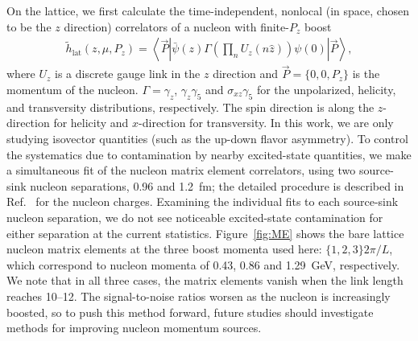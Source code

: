 On the lattice, we first calculate the time-independent, nonlocal (in space, chosen to be the $z$ direction) correlators of a nucleon with finite-$P_z$ boost
%
\begin{align}
\label{eq:qlat}
\tilde{h}_\text{lat}(z,\mu,P_z) =  
  \left\langle \vec{P} \right|
    \bar{\psi}(z) \Gamma \left( \prod_n U_z(n\hat{z})\right) \psi(0)
  \left| \vec{P} \right\rangle,
\end{align}
%
where $U_z$ is a discrete gauge link in the $z$ direction and $\vec{P}=\{0,0,P_z\}$ is the momentum of the nucleon. $\Gamma=\gamma_z$, $\gamma_z\gamma_5$ and $\sigma_{xz}\gamma_5$ for the unpolarized, helicity, and transversity distributions, respectively. The spin direction is along the $z$-direction for helicity and  $x$-direction for transversity.
In this work, we are only studying 
isovector quantities (such as the up-down flavor asymmetry).
To control the systematics due to contamination by nearby excited-state quantities, 
we make a simultaneous fit of the nucleon matrix element correlators,
using two source-sink nucleon separations, 0.96 and 1.2~fm; 
the detailed procedure is described in Ref.~\cite{Bhattacharya:2013ehc} for the nucleon charges.
Examining the individual fits to each source-sink nucleon separation, we do not see noticeable excited-state contamination for either 
separation at the current statistics. 
Figure~\ref{fig:ME} shows the bare lattice nucleon matrix elements at the three boost momenta used here: $\{1,2,3\} 2\pi/L$, which correspond to nucleon momenta of 0.43, 0.86 and 1.29~GeV, respectively. 
We note that in all three cases, the matrix elements vanish when the link length reaches 10--12.
The signal-to-noise ratios worsen as the nucleon is increasingly boosted, so to push this method forward, future studies should investigate methods for improving nucleon momentum sources.


